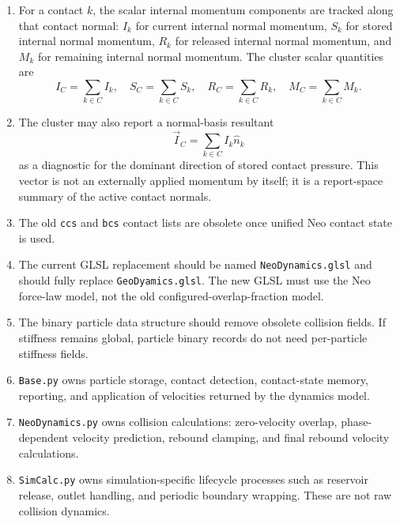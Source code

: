 \begin{enumerate}
    \item For a contact \(k\), the scalar internal momentum components are tracked along that contact normal: \(I_k\) for current internal normal momentum, \(S_k\) for stored internal normal momentum, \(R_k\) for released internal normal momentum, and \(M_k\) for remaining internal normal momentum. The cluster scalar quantities are
    \[
        I_C = \sum_{k \in C} I_k,\quad
        S_C = \sum_{k \in C} S_k,\quad
        R_C = \sum_{k \in C} R_k,\quad
        M_C = \sum_{k \in C} M_k.
    \]

    \item The cluster may also report a normal-basis resultant
    \[
        \vec I_C = \sum_{k \in C} I_k \hat n_k
    \]
    as a diagnostic for the dominant direction of stored contact pressure. This vector is not an externally applied momentum by itself; it is a report-space summary of the active contact normals.

    \item The old \texttt{ccs} and \texttt{bcs} contact lists are obsolete once unified Neo contact state is used.

    \item The current GLSL replacement should be named \texttt{NeoDynamics.glsl} and should fully replace \texttt{GeoDyamics.glsl}. The new GLSL must use the Neo force-law model, not the old configured-overlap-fraction model.

    \item The binary particle data structure should remove obsolete collision fields. If stiffness remains global, particle binary records do not need per-particle stiffness fields.

    \item \texttt{Base.py} owns particle storage, contact detection, contact-state memory, reporting, and application of velocities returned by the dynamics model.

    \item \texttt{NeoDynamics.py} owns collision calculations: zero-velocity overlap, phase-dependent velocity prediction, rebound clamping, and final rebound velocity calculations.

    \item \texttt{SimCalc.py} owns simulation-specific lifecycle processes such as reservoir release, outlet handling, and periodic boundary wrapping. These are not raw collision dynamics.
\end{enumerate}
